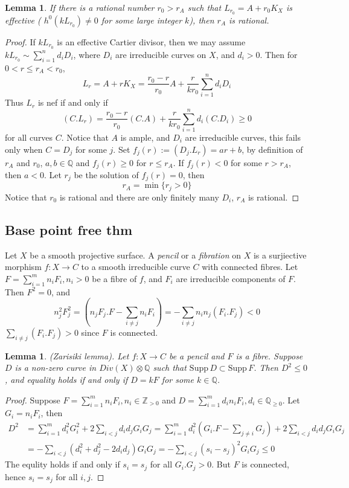 \documentclass{article}
\newtheorem{lem}[defn]{Lemma}
\begin{document}
\begin{lem}
  If there is a rational number $ r_0>r_A $ such that $ L_{r_0}=A+r_0K_X $ is effective ( $ h^0(kL_{r_0})\neq 0 $ for some large integer $ k $), then $ r_A $ is rational.
\end{lem}
\begin{proof}
  If $ kL_{r_0} $ is an effective Cartier divisor, then we may assume $ kL_{r_0}\sim \sum_{i=1}^{n}d_iD_i  $, where $ D_i $ are irreducible curves on $ X $, and $ d_i>0 $. Then for $ 0<r\leqslant r_A< r_0 $,
  \[ L_r=A+rK_X=\frac{r_0-r}{r_0}A+\frac{r}{kr_0} \sum_{i=1}^{n}d_iD_i \]
  Thus $ L_r $ is nef if and only if
  \[ (C.L_r)=\frac{r_0-r}{r_0}(C.A)+\frac{r}{kr_0} \sum_{i=1}^{n}d_i(C.D_i) \geqslant 0\]
  for all curves $ C $. Notice that $ A $ is ample, and $ D_i $ are irreducible curves, this fails only when  $ C=D_j $ for some $ j $. Set $ f_j(r):=(D_j.L_r)=ar+b $, by definition of $ r_A $ and $ r_0 $, $ a,b\in\mathbb{Q} $ and $  f_j(r)\geqslant0 $ for $ r\leqslant r_A $. If  $ f_j(r)<0 $ for some $ r>r_A $, then $ a<0 $. Let $ r_j $ be the solution of $ f_j(r)=0 $, then
  \[ r_A=\min\{r_j>0\} \]
  Notice that $ r_0 $ is rational and there are only finitely many $ D_i $, $ r_A $ is rational.
\end{proof}

\subsection{Base point free thm}
Let $ X $ be a smooth projective surface. A \emph{pencil}  or a \emph{fibration}  on $ X $ is a surjiective morphism $ f:X\to C $ to a smooth irreducible curve $ C $ with connected fibres. Let $ F=\sum_{i=1}^{m}n_iF_i , n_i>0$ be a fibre of $ f $, and $ F_i $ are irreducible components of $ F $. Then $ F^2=0 $, and
\[ n_j^2F_j^2=(n_jF_j.F-\sum_{i\neq j}n_iF_i)=-\sum_{i\neq j}n_in_j(F_i.F_j)<0 \]
$ \sum_{i\neq j}(F_i.F_j) >0$ since $ F $ is connected.
\begin{lem}
  (Zarisiki lemma). Let $ f:X\to C $ be a pencil  and $ F $ is a fibre. Suppose $ D $ is a non-zero curve  in $ Div(X)\otimes \mathbb{Q} $ such that $ \mathrm{Supp}\,D \subset \mathrm{Supp}\,F  $. Then $ D^2\leqslant 0 $, and equality holds if and only if $ D=kF $ for some $ k\in \mathbb{Q} $.
\end{lem}
\begin{proof}
  Suppose $ F=\sum_{i=1} ^{m}n_iF_i, n_i\in \mathbb{Z}_{>0}$ and $ D=\sum_{i=1} ^{m}d_in_iF_i, d_i\in \mathbb{Q}_{\geqslant0} $. Let $ G_i=n_iF_i $, then
  \begin{equation*}
    \begin{aligned}
      D^2 & =\sum_{i=1}^{m}d_i^2G_i^2+2\sum_{i<j}d_id_jG_iG_j=\sum_{i=1}^{m}d_i^2(G_i.F-\sum_{j\neq i}G_j)+ 2\sum_{i<j}d_id_jG_iG_j \\
          & =-\sum_{i<j}(d_i^2+d_j^2-2d_id_j)G_iG_j=-\sum_{i<j}(s_i-s_j)^2G_iG_j\leqslant0
    \end{aligned}
  \end{equation*}
  The equlity holds if and only if $ s_i=s_j $ for all $ G_i.G_j>0 $. But $ F $ is connected, hence $ s_i=s_j $ for all $ i,j $.
\end{proof}
\end{document}
